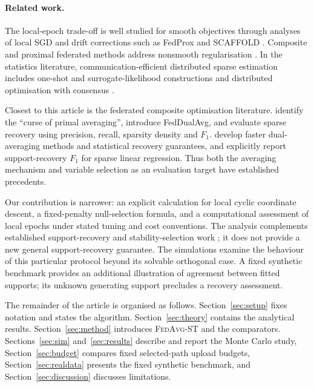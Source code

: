 \paragraph{Related work.} The local-epoch trade-off is well studied for
smooth objectives through analyses of local SGD
\citep{stich2019,li2020convergence} and drift corrections such as FedProx
\citep{li2020fedprox} and SCAFFOLD \citep{karimireddy2020}.
Composite and proximal federated methods address nonsmooth regularisation
\citep{tran2021}. In the statistics literature, communication-efficient
distributed sparse estimation includes one-shot and surrogate-likelihood
constructions \citep{lee2017,battey2018,jordan2019} and distributed
optimisation with consensus \citep{boyd2011,duchi2012,wang2017}.

Closest to this article is the federated composite optimisation
literature. \citet{yuan2021fco} identify the ``curse of primal averaging'',
introduce FedDualAvg, and evaluate sparse recovery using precision,
recall, sparsity density and $F_1$. \citet{bao2022} develop faster
dual-averaging methods and statistical recovery guarantees, and explicitly
report support-recovery $F_1$ for sparse linear regression. Thus both the
averaging mechanism and variable selection as an evaluation target have
established precedents.

Our contribution is narrower: an explicit calculation for local cyclic
coordinate descent, a fixed-penalty null-selection formula, and a
computational assessment of local epochs under stated tuning and cost
conventions. The analysis complements established support-recovery and
stability-selection work \citep{zhaoyu2006,meinshausen2010}; it does not
provide a new general support-recovery guarantee. The simulations examine
the behaviour of this particular protocol beyond its solvable orthogonal
case. A fixed synthetic benchmark provides an additional illustration of
agreement between fitted supports; its unknown generating support
precludes a recovery assessment.

The remainder of the article is organised as follows.
Section~\ref{sec:setup} fixes notation and states the algorithm.
Section~\ref{sec:theory} contains the analytical results.
Section~\ref{sec:method} introduces \textsc{FedAvg-ST} and the comparators.
Sections~\ref{sec:sim} and~\ref{sec:results} describe and report the Monte
Carlo study, Section~\ref{sec:budget} compares fixed selected-path upload
budgets, Section~\ref{sec:realdata} presents the fixed synthetic benchmark, and
Section~\ref{sec:discussion} discusses limitations.
